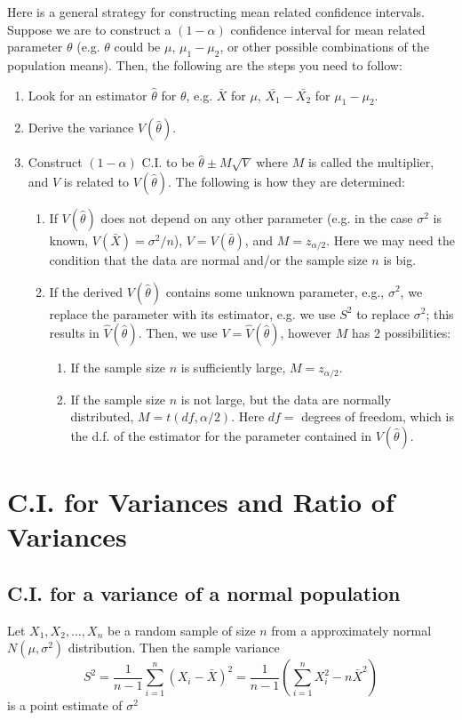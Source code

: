 \begin{note}
\end{note}
{\color{blue} Here is a general strategy for constructing mean related confidence intervals. Suppose we are to construct a $(1 - \alpha)$ confidence interval for mean related parameter $\theta$ (e.g. $\theta$ could be $\mu$, $\mu_1 - \mu_2$, or other possible combinations of the population means). Then, the following are the steps you need to follow:
\begin{enumerate}
    \item Look for an estimator $\hat{\theta}$ for $\theta$, e.g. $\bar{X}$ for $\mu$, $\bar{X_1} - \bar{X_2}$ for $\mu_1 - \mu_2$.
    \item Derive the variance $V(\hat{\theta})$.
    \item Construct $(1 - \alpha)$ C.I. to be $\hat{\theta} \pm M \sqrt{V}$ where $M$ is called the multiplier, and $V$ is related to $V(\hat{\theta})$. The following is how they are determined:
    \begin{enumerate}
        \item If $V(\hat{\theta})$ does not depend on any other parameter (e.g. in the case $\sigma^2$ is known, $V(\bar{X}) = \sigma^2/n$), $V = V(\bar{\theta})$, and $M = z_{\alpha/2}$. Here we may need the condition that the data are normal and/or the sample size $n$ is big.
        \item If the derived $V(\hat{\theta})$ contains some unknown parameter, e.g., $\sigma^2$, we replace the parameter with its estimator, e.g. we use $S^2$ to replace $\sigma^2$; this results in $\hat{V}(\hat{\theta})$. Then, we use $V = \hat{V}(\hat{\theta})$, however $M$ has 2 possibilities:
        \begin{enumerate}
            \item If the sample size $n$ is sufficiently large, $M = z_{\alpha/2}$.
            \item If the sample size $n$ is not large, but the data are normally distributed, $M = t(df, \alpha/2)$. Here $df = $ degrees of freedom, which is the d.f. of the estimator for the parameter contained in $V(\hat{\theta})$.
        \end{enumerate}
    \end{enumerate}
\end{enumerate}
}
\section{C.I. for Variances and Ratio of Variances}
\subsection{C.I. for a variance of a normal population}
Let $X_1, X_2, \dots, X_n$ be a random sample of size $n$ from a approximately normal $N(\mu, \sigma^2)$ distribution. Then the sample variance
$$
S^2 = \dfrac{1}{n - 1}\sum_{i = 1}^n (X_i - \bar{X})^2 = \dfrac{1}{n -1 }\left( \sum_{i = 1}^n X_i^2 - n\bar{X}^2 \right)
$$
is a point estimate of $\sigma^2$
